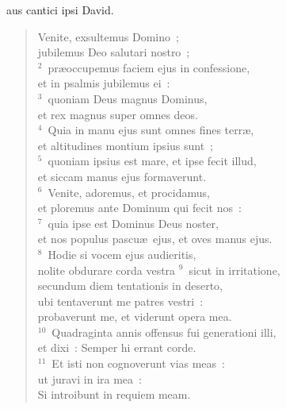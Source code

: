 \bchapter
{}aus cantici ipsi David. \begin{flushleft}\begin{verse}\vspace{6pt}Venite, exsultemus Domino~;\\ jubilemus Deo salutari nostro~;\\
${}^{2}$~pr\ae occupemus faciem ejus in confessione,\\ et in psalmis jubilemus ei~:\\
${}^{3}$~quoniam Deus magnus Dominus,\\ et rex magnus super omnes deos.\\
${}^{4}$~Quia in manu ejus sunt omnes fines terr\ae ,\\ et altitudines montium ipsius sunt~;\\
${}^{5}$~quoniam ipsius est mare, et ipse fecit illud,\\ et siccam manus ejus formaverunt.\\
${}^{6}$~Venite, adoremus, et procidamus,\\ et ploremus ante Dominum qui fecit nos~:\\
${}^{7}$~quia ipse est Dominus Deus noster,\\ et nos populus pascu\ae\ ejus, et oves manus ejus.\\
${}^{8}$~Hodie si vocem ejus audieritis,\\ nolite obdurare corda vestra
${}^{9}$~sicut in irritatione,\\ secundum diem tentationis in deserto,\\ ubi tentaverunt me patres vestri~:\\ probaverunt me, et viderunt opera mea.\\
${}^{10}$~Quadraginta annis offensus fui generationi illi,\\ et dixi~: Semper hi errant corde.\\
${}^{11}$~Et isti non cognoverunt vias meas~:\\ ut juravi in ira mea~:\\ Si introibunt in requiem meam.\end{verse}\end{flushleft}



